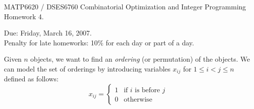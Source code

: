 \documentclass[11pt]{article}
\begin{document}
\begin{center}
  \begin{large}
     MATP6620 / DSES6760 Combinatorial Optimization and Integer Programming \\
       Homework 4.
  \end{large}
\end{center}

\begin{flushright}
   Due:  Friday, March 16, 2007.  \\
Penalty for late homeworks: 10\% for each day or part of a day.
\end{flushright}

         Given $n$ objects,
         we want to find an {\em ordering} (or permutation) of the objects.
         We can model the set of orderings by introducing
         variables $x_{ij}$ for $1 \leq i < j \leq n$  defined as follows:
         \begin{displaymath}
            x_{ij} = \left\{ \begin{array}{ll}
                        1 & \mbox{if $i$ is before $j$} \\
                        0 & \mbox{otherwise}
                     \end{array}  \right.
         \end{displaymath}
\end{document}
